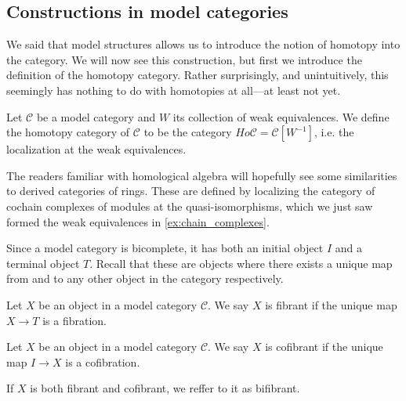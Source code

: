 \subsection{Constructions in model categories}

We said that model structures allows us to introduce the notion of homotopy into the category. We will now see this construction, but first we introduce the definition of the homotopy category. Rather surprisingly, and unintuitively, this seemingly has nothing to do with homotopies at all---at least not yet. 

\begin{definition}
\label{def:homotopy_category}
Let $\mathcal{C}$ be a model category and $W$ its collection of weak equivalences. We define the homotopy category of $\mathcal{C}$ to be the category $Ho\mathcal{C} = \mathcal{C}[W^{-1}]$, i.e. the localization at the weak equivalences. 
\end{definition}

\begin{remark}
The readers familiar with homological algebra will hopefully see some similarities to derived categories of rings. These are defined by localizing the category of cochain complexes of modules at the quasi-isomorphisms, which we just saw formed the weak equivalences in \cref{ex:chain_complexes}. 
\end{remark}

Since a model category is bicomplete, it has both an initial object $I$ and a terminal object $T$. Recall that these are objects where there exists a unique map from and to any other object in the category respectively. 

\begin{definition}
\label{def:fibrant}
Let $X$ be an object in a model category $\mathcal{C}$. We say $X$ is fibrant if the unique map $X\longrightarrow T$ is a fibration. 
\end{definition}

\begin{definition}
\label{def:cofibrant}
Let $X$ be an object in a model category $\mathcal{C}$. We say $X$ is cofibrant if the unique map $I\longrightarrow X$ is a cofibration. 
\end{definition}

If $X$ is both fibrant and cofibrant, we reffer to it as bifibrant. 



